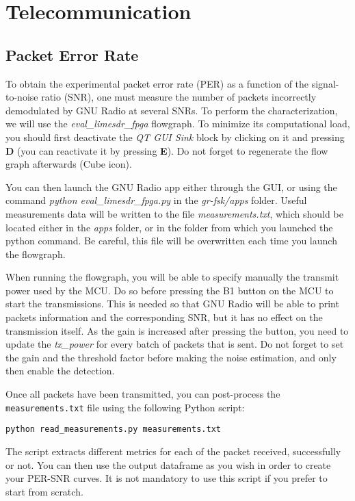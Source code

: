 \section{Telecommunication}
\subsection{Packet Error Rate}
To obtain the experimental packet error rate (PER) as a function of the signal-to-noise ratio (SNR), one must measure the number of packets incorrectly demodulated by GNU Radio at several SNRs. To perform the characterization, we will use the \textit{eval\_limesdr\_fpga} flowgraph. To minimize its computational load, you should first deactivate the \textit{QT GUI Sink} block by clicking on it and pressing \textbf{D} (you can reactivate it by pressing \textbf{E}). Do not forget to regenerate the flow graph afterwards (Cube icon).

You can then launch the GNU Radio app either through the GUI, or using the command \textit{python eval\_limesdr\_fpga.py} in the \textit{gr-fsk/apps} folder. Useful measurements data will be written to the file \textit{measurements.txt}, which should be located either in the \textit{apps} folder, or in the folder from which you launched the python command. Be careful, this file will be overwritten each time you launch the flowgraph.

When running the flowgraph, you will be able to specify manually the transmit power used by the MCU. Do so before pressing the B1 button on the MCU to start the transmissions.  This is needed so that GNU Radio will be able to print packets information and the corresponding SNR, but it has no effect on the transmission itself. As the gain is increased after pressing the button, you need to update the \textit{tx\_power} for every batch of packets that is sent. Do not forget to set the gain and the threshold factor before making the noise estimation, and only then enable the detection.

Once all packets have been transmitted, you can post-process the \texttt{measurements.txt} file using the following Python script:
    \begin{center}
    \texttt{python read\_measurements.py measurements.txt}\\
    \end{center}
The script extracts different metrics for each of the packet received, successfully or not. You can then use the output dataframe as you wish in order to create your PER-SNR curves. It is not mandatory to use this script if you prefer to start from scratch.

